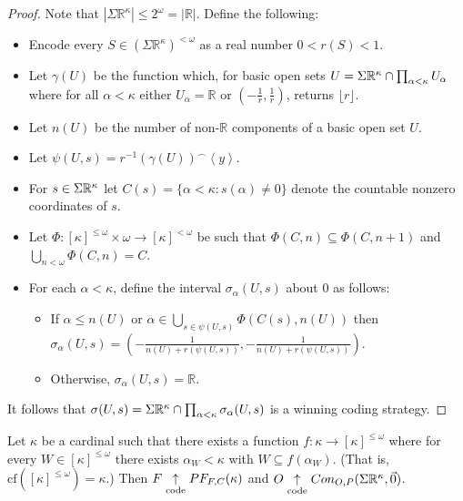 \begin{proof}
Note that $|\Sigma\mathbb{R}^\kappa| \leq 2^\omega = |\mathbb{R}|$. Define the following:

    \begin{itemize}
    \item Encode every $S \in (\Sigma\mathbb{R}^{\kappa})^{<\omega}$ as a real number $0<r(S)<1$. 
    \item Let $\gamma(U)$ be the function which, for basic open sets $U=\Sigma\mathbb{R}^{\kappa}\cap\prod_{\alpha<\kappa}U_\alpha$ where for all $\alpha<\kappa$ either $U_\alpha=\mathbb{R}$ or $(-\frac{1}{r},\frac{1}{r})$, returns $\lfloor r \rfloor$.
    \item Let $n(U)$ be the number of non-$\mathbb{R}$ components of a basic open set $U$.
    \item Let $\psi(U,s)=r^{-1}(\gamma(U))^\frown\left<y\right>$.
    \item For $s\in\Sigma\mathbb{R}^{\kappa}$ let $C(s)=\{\alpha<\kappa:s(\alpha)\not=0\}$ denote the countable nonzero coordinates of $s$.
    \item Let $\Phi:[\kappa]^{\leq\omega}\times\omega\to[\kappa]^{<\omega}$ be such that $\Phi(C,n)\subseteq\Phi(C,n+1)$ and $\bigcup_{n<\omega}\Phi(C,n)=C$.
    \item For each $\alpha<\kappa$, define the interval $\sigma_\alpha(U,s)$ about $0$ as follows:
        \begin{itemize}
        \item If $\alpha\leq n(U)$ or $\alpha\in\bigcup_{s\in\psi(U,s)}\Phi(C(s),n(U))$ then $\sigma_\alpha(U,s)=(-\frac{1}{n(U)+r(\psi(U,s))},-\frac{1}{n(U)+r(\psi(U,s))})$.
        \item Otherwise, $\sigma_\alpha(U,s)=\mathbb{R}$.
        \end{itemize}
    \end{itemize}

It follows that $\sigma(U,s)=\Sigma\mathbb{R}^{\kappa}\cap\prod_{\alpha<\kappa} \sigma_\alpha(U,s)$ is a winning coding strategy.
\end{proof}

\begin{thm}
Let $\kappa$ be a cardinal such that there exists a function $f:\kappa\to[\kappa]^{\leq \omega}$ where for every $W\in[\kappa]^{\leq\omega}$ there exists $\alpha_W<\kappa$ with $W\subseteq f(\alpha_W)$. (That is, $\textrm{cf}([\kappa]^{\leq\omega})=\kappa$.) Then $F \underset{\text{code}}{\uparrow} PF_{F,C}(\kappa)$ and $O \underset{\text{code}}{\uparrow} Con_{O,P}(\Sigma\mathbb{R}^{\kappa},\vec{0})$.
\end{thm}

